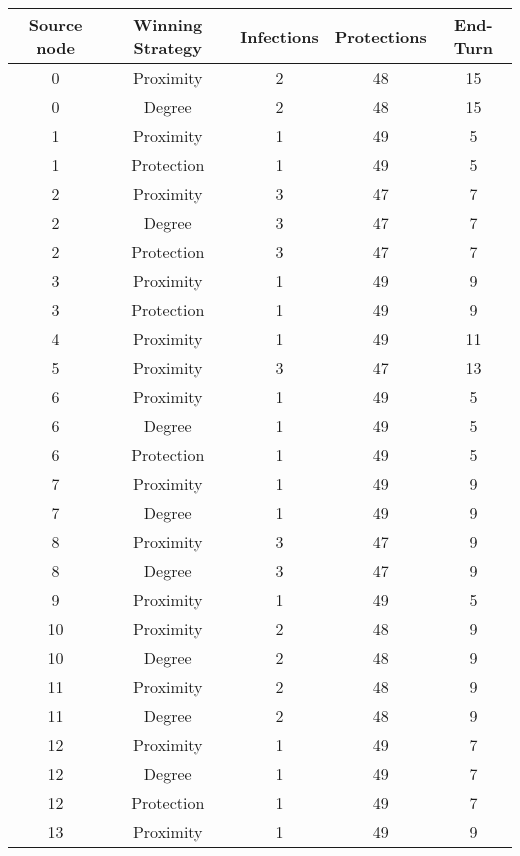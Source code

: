 \documentclass[results.tex]{subfiles}
\begin{document}
\begin{center}
  \begin{tabular}{| c || c | c | c | c |}
    \hline
    {\bfseries Source node} & {\bfseries Winning Strategy} & {\bfseries Infections} & {\bfseries Protections} & {\bfseries End-Turn} \\  %
    \hline\hline
    0 & Proximity & 2 & 48 & 15 \\ 
    \hline
    0 & Degree & 2 & 48 & 15 \\ 
    \hline
    1 & Proximity & 1 & 49 & 5 \\ 
    \hline
    1 & Protection & 1 & 49 & 5 \\ 
    \hline
    2 & Proximity & 3 & 47 & 7 \\ 
    \hline
    2 & Degree & 3 & 47 & 7 \\ 
    \hline
    2 & Protection & 3 & 47 & 7 \\ 
    \hline
    3 & Proximity & 1 & 49 & 9 \\ 
    \hline
    3 & Protection & 1 & 49 & 9 \\ 
    \hline
    4 & Proximity & 1 & 49 & 11 \\ 
    \hline
    5 & Proximity & 3 & 47 & 13 \\ 
    \hline
    6 & Proximity & 1 & 49 & 5 \\ 
    \hline
    6 & Degree & 1 & 49 & 5 \\ 
    \hline
    6 & Protection & 1 & 49 & 5 \\ 
    \hline
    7 & Proximity & 1 & 49 & 9 \\ 
    \hline
    7 & Degree & 1 & 49 & 9 \\ 
    \hline
    8 & Proximity & 3 & 47 & 9 \\ 
    \hline
    8 & Degree & 3 & 47 & 9 \\ 
    \hline
    9 & Proximity & 1 & 49 & 5 \\ 
    \hline
    10 & Proximity & 2 & 48 & 9 \\ 
    \hline
    10 & Degree & 2 & 48 & 9 \\ 
    \hline
    11 & Proximity & 2 & 48 & 9 \\ 
    \hline
    11 & Degree & 2 & 48 & 9 \\ 
    \hline
    12 & Proximity & 1 & 49 & 7 \\ 
    \hline
    12 & Degree & 1 & 49 & 7 \\ 
    \hline
    12 & Protection & 1 & 49 & 7 \\ 
    \hline
    13 & Proximity & 1 & 49 & 9 \\ 

\end{tabular}
\end{center}
\end{document}
